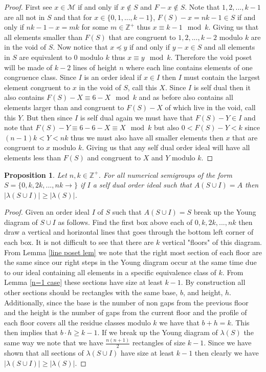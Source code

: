 \documentclass[11pt,letterpaper]{article}
\newtheorem{prop}[thm]{Proposition}
\theoremstyle{definition}
\newcommand{\Z}{\mathbb{Z}}
\begin{document}
\begin{proof}
     First see $x\in\mathcal{M}$ if and only if $x\notin S$ and $F-x\notin S$. Note that $1,2,...,k-1$ are all not in $S$ and that for $x\in\{0,1,...,k-1\}$, $F(S)-x=nk-1\in S$ if and only if $nk-1-x=mk$ for some $m\in\Z^+$ thus $x\equiv k-1\mod k$. Giving us that all elements smaller than $F(S)$ that are congruent to $1,2,...,k-2$ modulo $k$ are in the void of $S$. Now notice that $x\preccurlyeq y$ if and only if $y-x\in S$ and all elements in $S$ are equivalent to 0 modulo $k$ thus $x\equiv y\mod k$. Therefore the void poset will be made of $k-2$ lines of height $n$ where each line contains elements of one congruence class. Since $I$ is an order ideal if $x\in I$ then $I$ must contain the largest element congruent to $x$ in the void of $S$, call this $X$. Since $I$ is self dual then it also contains $F(S)-X\equiv 6-X\mod k$ and as before also contains all elements larger than and congruent to $F(S)-X$ of which live in the void, call this $Y$. But then since $I$ is self dual again we must have that $F(S)-Y\in I$ and note that $F(S)-Y\equiv 6-6-X\equiv X\mod k$ but also $0<F(S)-Y<k$ since $(n-1)k<Y<nk$ thus we must also have all smaller elements then $x$ that are congruent to $x$ modulo $k$. Giving us that any self dual order ideal will have all elements less than $F(S)$ and congruent to $X$ and $Y$ modulo $k$.
\end{proof}




\begin{prop}
    Let $n,k\in\Z^+$. For all numerical semigroups of the form $S=\{0,k,2k,...,nk\rightarrow\}$ if $I$ a self dual order ideal such that $A(S\cup I)=A$ then $|\lambda(S\cup I)|\geq |\lambda(S)|$. 
\end{prop}

\begin{proof}
    Given an order ideal $I$ of $S$ such that $A(S\cup I)=S$ break up the Young diagram of $S\cup I$ as follows. Find the first box above each of $0,k,2k,...,nk$ then draw a vertical and horizontal lines that goes through the bottom left corner of each box. It is not difficult to see that there are $k$ vertical "floors" of this diagram. From Lemma \ref{line poset lem} we note that the right most section of each floor are the same since our right steps in the Young diagram occur at the same time due to our ideal containing all elements in a specific equivalence class of $k$. From Lemma \ref{n=1 case} these sections have size at least $k-1$. By construction all other sections should be rectangles with the same base, $b$, and height, $h$. Additionally, since the base is the number of non gaps from the previous floor and the height is the number of gaps from the current floor and the profile of each floor covers all the residue classes modulo $k$ we have that $b+h=k$. This then implies that $b\cdot h\geq k-1$. If we break up the Young diagram of $\lambda(S)$ the same way we note that we have $\frac{n(n+1)}{2}$ rectangles of size $k-1$. Since we have shown that all sections of $\lambda(S\cup I)$ have size at least $k-1$ then clearly we have $|\lambda(S\cup I)|\geq |\lambda(S)|$.
\end{proof}
\end{document}
